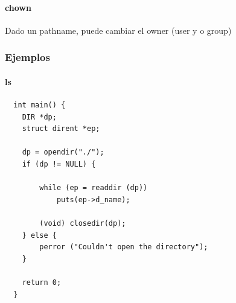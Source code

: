\documentclass{article}
\begin{document}
\paragraph{chown}\label{chown}

Dado un pathname, puede cambiar el owner (user y o group)

\subsubsection{Ejemplos}\label{ejemplos}

\paragraph{ls}\label{ls}


\begin{verbatim}
  int main() {
    DIR *dp;
    struct dirent *ep;

    dp = opendir("./");
    if (dp != NULL) {

        while (ep = readdir (dp))
            puts(ep->d_name);

        (void) closedir(dp);
    } else {
        perror ("Couldn't open the directory");
    }

    return 0;
  }
\end{verbatim}
\end{document}
